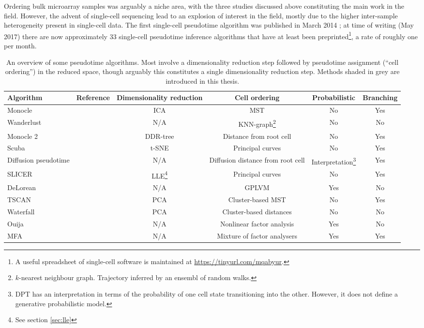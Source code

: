 Ordering bulk microarray samples was arguably a niche area, with the three studies discussed above constituting the main work in the field. However, the advent of single-cell sequencing lead to an explosion of interest in the field, mostly due to the higher inter-sample heterogeneity present in single-cell data. The first single-cell pseudotime algorithm was published in March 2014 \cite{Trapnell2014-xi}; at time of writing (May 2017) there are now approximately 33 single-cell pseudotime inference algorithms that have at least been preprinted\footnote{
A useful spreadsheet of single-cell software is maintained at \url{https://tinyurl.com/mqabyur}.
}, a rate of roughly one per month.

\begin{sidewaystable}
  \centering
\begin{tabular}{|lccccc|}
\hline
Algorithm & Reference & Dimensionality reduction & Cell ordering & Probabilistic & Branching \\
\hline
Monocle & \cite{Trapnell2014-xi} & ICA &
MST & No & Yes \\
Wanderlust & \cite{Bendall2014-rc} & N/A & KNN-graph\footnote{$k$-nearest neighbour graph. Trajectory inferred by an ensembl of random walks.} & No & No \\
Monocle 2 & \cite{Qiu2017-eu} & DDR-tree & Distance from root cell & No & Yes \\
Scuba & \cite{Marco2014-ug} & t-SNE & Principal curves & No & Yes \\
Diffusion pseudotime & \cite{haghverdi2016diffusion} & N/A & Diffusion distance from root cell &
Interpretation\footnote{DPT has an interpretation in terms of the probability of one cell state transitioning into the other. However, it does not define a generative probabilistic model.} & Yes \\
SLICER & \cite{welch2016slicer} & LLE\footnote{See section \ref{sec:lle}} & Principal curves & No & Yes \\
DeLorean & \cite{Reid2016-yo} & N/A & GPLVM & Yes & No \\
TSCAN & \cite{Ji2016-gx} & PCA & Cluster-based MST & No & Yes \\
Waterfall & \cite{Shin2015} & PCA & Cluster-based distances & No & No \\
\rowcolor{Gray}
Ouija & \cite{Campbell2016-ys} & N/A & Nonlinear factor analysis & Yes & No \\
\rowcolor{Gray}
MFA & \cite{campbell2017probabilistic} & N/A & Mixture of factor analysers & Yes & Yes \\
\hline
\end{tabular}
\caption[An overview of some pseudotime algorithms.]{An overview of some pseudotime algorithms. Most involve a dimensionality reduction step followed by pseudotime assignment (``cell ordering'') in the reduced space, though arguably this constitutes a single dimensionality reduction step. Methods shaded in grey are introduced in this thesis.} \label{tbl:pseudotimecomparison}
\end{sidewaystable}

